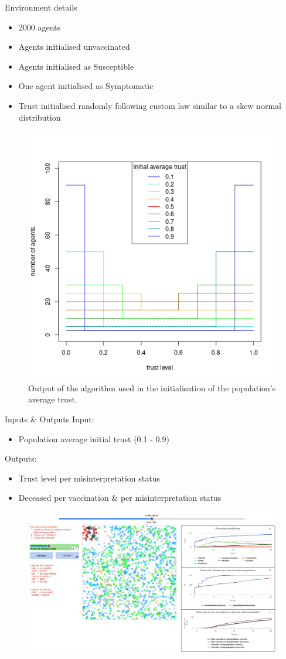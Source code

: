 \documentclass{beamer}
\begin{document}
\begin{frame}{Environment details}
    \begin{itemize}
        \item 2000 agents
        \item Agents initialised unvaccinated
        \item Agents initialised as Susceptible
        \item One agent initialised as Symptomatic
        \item Trust initialised randomly following custom law similar to a skew normal distribution
    \end{itemize}
    \begin{figure}
        \begin{center}
            \includegraphics[width=0.3\linewidth]{fig/initial_average_trust.png}
        \end{center}
        \caption{Output of the algorithm used in the initialisation of the population's average trust.}
    \end{figure}
\end{frame}

\begin{frame}{Inputs \& Outputs}
    Input:
    \begin{itemize}
        \item Population average initial trust (0.1 - 0.9)
    \end{itemize}
    Outputs:
    \begin{itemize}
        \item Trust level per misinterpretation status
        \item Deceased per vaccination \& per misinterpretation status
    \end{itemize}
    \begin{figure}
        \begin{center}
            \includegraphics[width=0.7\linewidth]{fig/simulation_user_layout.png}
        \end{center}
    \end{figure}
\end{frame}
\end{document}
